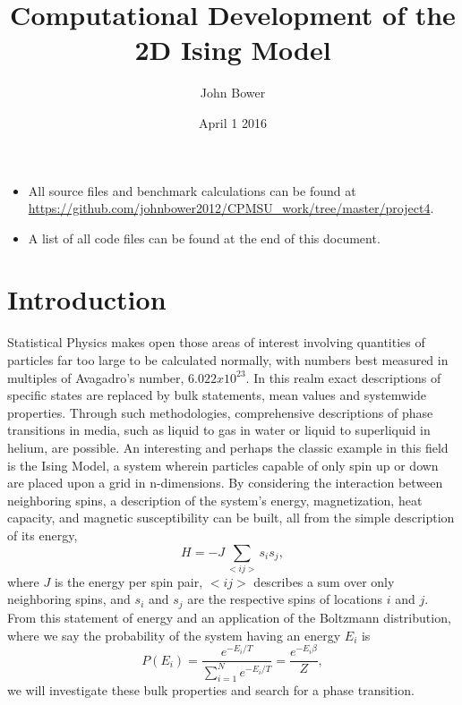 \documentclass[11pt,a4paper]{article}
\title{Computational Development of the 2D Ising Model}
\author{John Bower}
\date{April 1 2016}
\begin{document}
\maketitle

\begin{abstract}
\end{abstract}

\begin{itemize}
\item All source files and benchmark calculations can be found at \url{https://github.com/johnbower2012/CPMSU_work/tree/master/project4}.
\item A list of all code files can be found at the end of this document.
\end{itemize}

\section{Introduction}

Statistical Physics makes open those areas of interest involving quantities of particles far too large to be calculated normally, with numbers best measured in multiples of Avagadro's number, $6.022 x 10^23$. In this realm exact descriptions of specific states are replaced by bulk statements, mean values and systemwide properties. Through such methodologies, comprehensive descriptions of phase transitions in media, such as liquid to gas in water or liquid to superliquid in helium, are possible. An interesting and perhaps the classic example in this field is the Ising Model, a system wherein particles capable of only spin up or down are placed upon a grid in n-dimensions. By considering the interaction between neighboring spins, a description of the system's energy, magnetization, heat capacity, and magnetic susceptibility can be built, all from the simple description of its energy,
\begin{equation}
H = -J\sum\limits_{<ij>}s_is_j,
\end{equation}
where $J$ is the energy per spin pair, $<ij>$ describes a sum over only neighboring spins, and $s_i$ and $s_j$ are the respective spins of locations $i$ and $j$. From this statement of energy and 
an application of the Boltzmann distribution, where we say the probability of the system having an energy $E_i$ is
\begin{equation}
P(E_i) = \frac{e^{-E_i/T}}{\sum\limits^N_{i=1} e^{-E_i/T}} = \frac{e^{-E_i\beta}}{Z},
\end{equation}
we will investigate these bulk properties and search for a phase transition.
\end{document}

